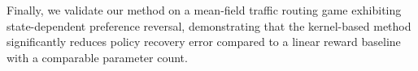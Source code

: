 \documentclass[11pt]{article}
\newcommand{\tv}[1]{\textcolor{black}{#1}} %
\begin{document}
Finally, we validate our method on a mean-field traffic routing game exhibiting state-dependent preference reversal, demonstrating that the kernel-based method significantly reduces policy recovery error compared to a linear reward baseline with a comparable parameter count.







\end{document}
